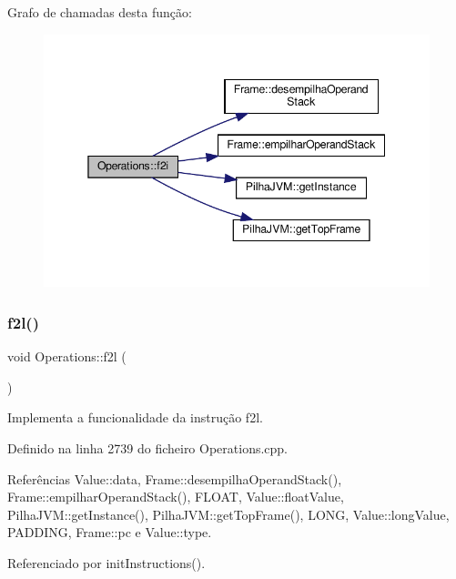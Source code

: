 Grafo de chamadas desta função\+:\nopagebreak
\begin{figure}[H]
\begin{center}
\leavevmode
\includegraphics[width=345pt]{classOperations_adea8a32fb2ba183d0200ac22e1126fde_cgraph}
\end{center}
\end{figure}
\mbox{\label{classOperations_a175cdab8d092bdd6c27bace9efbcd27e}} 
\subsubsection{\texorpdfstring{f2l()}{f2l()}}
{\footnotesize\ttfamily void Operations\+::f2l (\begin{DoxyParamCaption}{ }\end{DoxyParamCaption})\hspace{0.3cm}{\ttfamily [private]}}



Implementa a funcionalidade da instrução f2l. 



Definido na linha 2739 do ficheiro Operations.\+cpp.



Referências Value\+::data, Frame\+::desempilha\+Operand\+Stack(), Frame\+::empilhar\+Operand\+Stack(), F\+L\+O\+AT, Value\+::float\+Value, Pilha\+J\+V\+M\+::get\+Instance(), Pilha\+J\+V\+M\+::get\+Top\+Frame(), L\+O\+NG, Value\+::long\+Value, P\+A\+D\+D\+I\+NG, Frame\+::pc e Value\+::type.



Referenciado por init\+Instructions().

